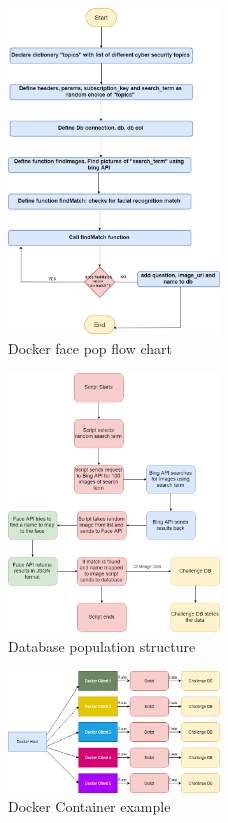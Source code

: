 \documentclass[12pt,a4paper]{article}
\begin{document}
\begin{figure}[!ht]
    \centering
    \includegraphics[width=0.5\textwidth]{Figs/Docker_face_pop.png} 
    \caption{Docker face pop flow chart} 
    \label{DockerFace}
\end{figure}     

\begin{figure}[!ht]
    \centering
    \includegraphics[width=0.50\textwidth]{Figs/Dbinsert_structure.png} 
    \caption{Database population structure} 
    \label{Dockerstructure}
\end{figure} 

\begin{figure}[!ht]
    \centering
    \includegraphics[width=0.50\textwidth]{Figs/Docker.png} 
    \caption{Docker Container example} 
    \label{Dockerexample}
\end{figure}
\end{document}
